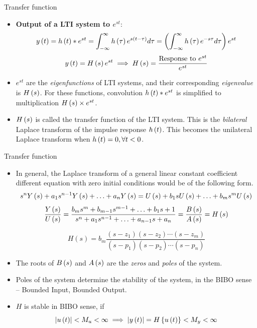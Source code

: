 \documentclass[aspectratio=169]{beamer}
\def\lp{\ensuremath\left(}
\def\rp{\ensuremath\right)}
\def\lv{\ensuremath\left\lvert}
\def\rv{\ensuremath\right\rvert}
\def\lc{\ensuremath\left\{}
\def\rc{\ensuremath\right\}}
\begin{document}
\begin{frame}{Transfer function}
\begin{itemize}    
    \item \textbf{Output of a LTI system to $e^{st}$}:
    \[ y\lp t\rp = h\lp t\rp * e^{st} = \int_{-\infty}^{\infty} h\lp \tau \rp e^{s\lp t - \tau\rp}  d\tau = \lp \int_{-\infty}^{\infty} h\lp \tau \rp e^{-s\tau}  d\tau \rp e^{st} \]
    \[ y\lp t\rp = H\lp s\rp e^{st} \implies H\lp s\rp = \frac{\text{Response to } e^{st}}{e^{st}}\] 

    \item $e^{st}$ are the \textit{eigenfunctions} of LTI systems, and their corresponding \textit{eigenvalue} is $H\lp s\rp$. For these functions, convolution $h\lp t\rp * e^{st}$ is simplified to multiplication $H\lp s\rp \times e^{st}$.

    \item $H\lp s\rp$ is called the transfer function of the LTI system. This is the \textit{bilateral} Laplace transform of the impulse response $h\lp t\rp$. This becomes the unilateral Laplace transform when $h\lp t\rp = 0, \forall t < 0$.
\end{itemize}
\end{frame}


\begin{frame}{Transfer function}
\begin{itemize}    
    \item In general, the Laplace transform of a general linear constant coefficient different equation with zero initial conditions would be of the following form.
    \[ s^nY\lp s\rp + a_1s^{n-1}Y\lp s\rp + \ldots + a_nY\lp s\rp = U\lp s\rp + b_1sU\lp s\rp + \ldots + b_ms^mU\lp s\rp \]
    \[ \frac{Y\lp s\rp}{U\lp s\rp} = \frac{b_ms^m + b_{m-1}s^{m-1} + \ldots + b_{1}s + 1}{s^n + a_1s^{n-1} + \ldots + a_{n-1}s + a_n}  = \frac{B\lp s\rp}{A\lp s\rp} = H\lp s\rp\]

    \[ H(s) = b_m\frac{\left(s - z_1\right)\left(s - z_2\right)\cdots\left(s - z_m\right)}{\left(s - p_1\right)\left(s - p_2\right)\cdots\left(s - p_n\right)} \]

    \item The roots of $B\lp s\rp$ and $A\lp s\rp$ are the \textit{zeros} and \textit{poles} of the system. 

    \item Poles of the system determine the stability of the system, in the BIBO sense -- Bounded Input, Bounded Output.

    \item $H$ is stable in BIBO sense, if
    \[ \lv u\lp t\rp \rv < M_u < \infty \implies \lv y\lp t\rp\rv = H\lc u\lp t\rp\rc < M_y < \infty \]
\end{itemize}
\end{frame}
\end{document}

